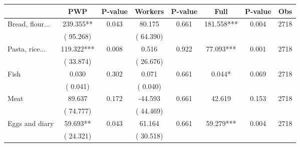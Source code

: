 
\begin{tabular}{l*{7}{c}}\hline&\multicolumn{1}{c}{PWP}&\multicolumn{1}{c}{P-value}&\multicolumn{1}{c}{Workers}&\multicolumn{1}{c}{P-value}&\multicolumn{1}{c}{Full}&\multicolumn{1}{c}{P-value}&\multicolumn{1}{c}{Obs} \\ \hline

 Bread, flour...       &            239.355**       &        0.043  &             80.175       &        0.661  &            181.558***       &              0.004 &  2718 \\ 
                       &       (      95.268)             &                               &       (      64.390)                     &                               &                                               &                                &                      \\ 

 Pasta, rice...       &            119.322***       &        0.008  &              0.516       &        0.922  &             77.093***       &              0.001 &  2718 \\ 
                       &       (      33.874)             &                               &       (      26.676)                     &                               &                                               &                                &                      \\ 

 Fish       &              0.030       &        0.302  &              0.071       &        0.661  &              0.044*       &              0.069 &  2718 \\ 
                       &       (       0.041)             &                               &       (       0.040)                     &                               &                                               &                                &                      \\ 

 Meat       &             89.637       &        0.172  &            -44.593       &        0.661  &             42.619       &              0.153 &  2718 \\ 
                       &       (      74.777)             &                               &       (      44.469)                     &                               &                                               &                                &                      \\ 

 Eggs and diary       &             59.693**       &        0.043  &             61.164       &        0.661  &             59.279***       &              0.004 &  2718 \\ 
                       &       (      24.321)             &                               &       (      30.518)                     &                               &                                               &                                &                      \\ 


\end{tabular}
